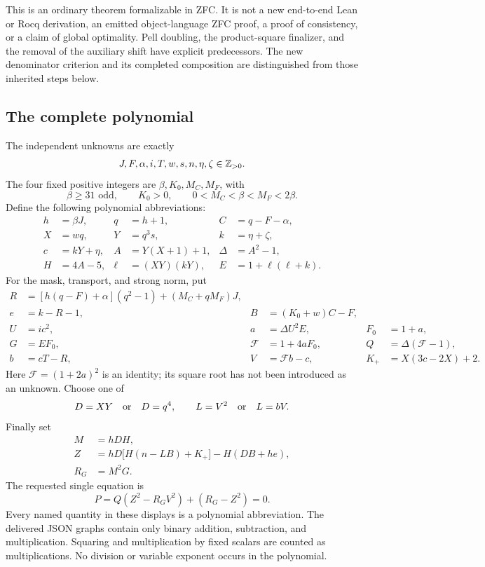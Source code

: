 This is an ordinary theorem formalizable in ZFC.  It is not a new
end-to-end Lean or Rocq derivation, an emitted object-language ZFC proof,
a proof of consistency, or a claim of global optimality.  Pell doubling,
the product-square finalizer, and the removal of the auxiliary shift have
explicit predecessors.  The new denominator criterion and its completed
composition are distinguished from those inherited steps below.
\cite{certificate,unshift}

\subsection{The complete polynomial}
\label{subsec:compact-definition}

The independent unknowns are exactly
\[
 J,F,\alpha,i,T,w,s,n,\eta,\zeta\in\mathbb Z_{>0}.
\]
The four fixed positive integers are \(\beta,K_0,M_C,M_F\), with
\begin{equation}
 \beta\ge31\text{ odd},\qquad K_0>0,\qquad
 0<M_C<\beta<M_F<2\beta.
 \label{eq:compact-portbox}
\end{equation}
Define the following polynomial abbreviations:
\begin{align}
 h&=\beta J,& q&=h+1,& C&=q-F-\alpha,\nonumber\\
 X&=wq,&Y&=q^3s,&k&=\eta+\zeta,\nonumber\\
 c&=kY+\eta,& A&=Y(X+1)+1,&
 \Delta&=A^2-1,\nonumber\\
 H&=4A-5,& \ell&=(XY)(kY),&
 E&=1+\ell(\ell+k).                         \label{eq:compact-base}
\end{align}
For the mask, transport, and strong norm, put
\begin{align}
 R&=[h(q-F)+\alpha](q^2-1)+(M_C+qM_F)J,\nonumber\\
 e&=k-R-1, & B&=(K_0+w)C-F,\nonumber\\
 U&=ic^2,& a&=\Delta U^2E,& F_0&=1+a,\nonumber\\
 G&=EF_0,& \mathcal F&=1+4aF_0,&
 Q&=\Delta(\mathcal F-1),\nonumber\\
 b&=cT-R,& V&=\mathcal F b-c,&
 K_+&=X(3c-2X)+2.                            \label{eq:compact-strong}
\end{align}
Here \(\mathcal F=(1+2a)^2\) is an identity; its square root has not
been introduced as an unknown.  Choose one of
\[
 D=XY\quad\hbox{or}\quad D=q^4,
 \qquad
 L=V^2\quad\hbox{or}\quad L=bV.
\]
Finally set
\begin{align}
 M&=hDH,\nonumber\\
 Z&=hD\bigl[H(n-LB)+K_+\bigr]-H(DB+he),\nonumber\\
 R_G&=M^2G.                                             \label{eq:compact-carrier}
\end{align}
The requested single equation is
\begin{equation}
 \boxed{\ P=Q(Z^2-R_GV^2)+(R_G-Z^2)=0.\ }
 \label{eq:compact-final}
\end{equation}
Every named quantity in these displays is a polynomial abbreviation.
The delivered JSON graphs contain only binary addition, subtraction, and
multiplication.  Squaring and multiplication by fixed scalars are counted
as multiplications.  No division or variable exponent occurs in the
polynomial.

